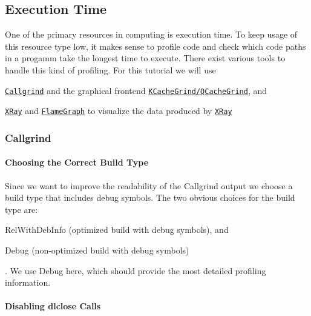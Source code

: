 \subsection*{Execution Time}

One of the primary resources in computing is execution time. To keep usage of this resource type low, it makes sense to profile code and check which code paths in a progamm take the longest time to execute. There exist various tools to handle this kind of profiling. For this tutorial we will use


\begin{DoxyEnumerate}
\item \href{http://valgrind.org/docs/manual/cl-manual.html}{\tt Callgrind} and the graphical frontend \href{https://kcachegrind.github.io/html/Home.html}{\tt K\+Cache\+Grind/\+Q\+Cache\+Grind}, and
\item \href{https://llvm.org/docs/XRay.html}{\tt X\+Ray} and \href{https://github.com/brendangregg/FlameGraph}{\tt Flame\+Graph} to visualize the data produced by \href{https://llvm.org/docs/XRay.html}{\tt X\+Ray}
\end{DoxyEnumerate}

\subsubsection*{Callgrind}

\paragraph*{Choosing the Correct Build Type}

Since we want to improve the readability of the Callgrind output we choose a build type that includes debug symbols. The two obvious choices for the build type are\+:


\begin{DoxyItemize}
\item {\ttfamily Rel\+With\+Deb\+Info} (optimized build with debug symbols), and
\item {\ttfamily Debug} (non-\/optimized build with debug symbols)
\end{DoxyItemize}

. We use {\ttfamily Debug} here, which should provide the most detailed profiling information.

\paragraph*{Disabling {\ttfamily dlclose} Calls}

